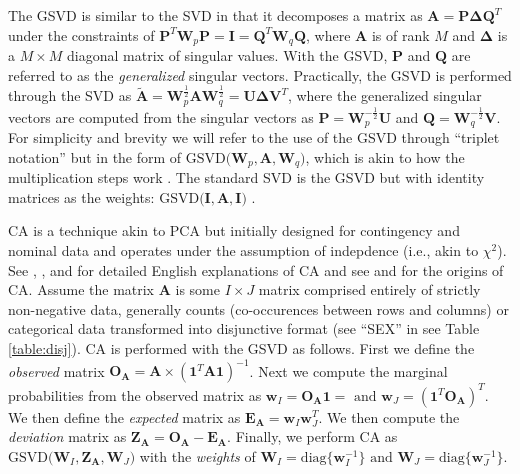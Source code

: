 \documentclass[12pt]{article}
\begin{document}
The GSVD is similar to the SVD in that it decomposes a matrix as
\({\mathbf A} = {\mathbf P} {\boldsymbol \Delta} {\mathbf Q}^{T}\) under
the constraints of
\({\mathbf P}^{T}{\mathbf W}_{p}{\mathbf P} = {\mathbf I} = {\mathbf Q}^{T}{\mathbf W}_{q}{\mathbf Q}\),
where \({\mathbf A}\) is of rank \(M\) and \({\boldsymbol \Delta}\) is a
\(M \times M\) diagonal matrix of singular values. With the GSVD,
\({\mathbf P}\) and \({\mathbf Q}\) are referred to as the
\emph{generalized} singular vectors. Practically, the GSVD is performed
through the SVD as
\(\widetilde{\mathbf A} = {\mathbf W}_{p}^{\frac{1}{2}}{\mathbf A}{\mathbf W}_{q}^{\frac{1}{2}} = {\mathbf U} {\boldsymbol \Delta} {\mathbf V}^{T}\),
where the generalized singular vectors are computed from the singular
vectors as \({\mathbf P} = {\mathbf W}_{p}^{-\frac{1}{2}}{\mathbf U}\)
and \({\mathbf Q} = {\mathbf W}_{q}^{-\frac{1}{2}}{\mathbf V}\). For
simplicity and brevity we will refer to the use of the GSVD through
``triplet notation'' \citep{holmes_multivariate_2008} but in the form of
\(\mathrm{GSVD(} {\mathbf W}_{p}, {\mathbf A}, {\mathbf W}_{q} \mathrm{)}\),
which is akin to how the multiplication steps work \citep[see
also][]{beaton2018generalization}. The standard SVD is the GSVD but with
identity matrices as the weights:
\(\mathrm{GSVD(} {\mathbf I}, {\mathbf A}, {\mathbf I} \mathrm{)}\)
\citep[see also][]{takane_relationships_2003}.

CA is a technique akin to PCA but initially designed for contingency and
nominal data and operates under the assumption of indepdence (i.e., akin
to \(\chi^2\)). See \citet{greenacre_theory_1984},
\citet{greenacre_correspondence_2010-1}, and
\citet{lebart_multivariate_1984} for detailed English explanations of CA
and see \citet{escofier-cordier_analyse_1965} and
\citet{benzecri_analyse_1973} for the origins of CA. Assume the matrix
\({\mathbf A}\) is some \(I \times J\) matrix comprised entirely of
strictly non-negative data, generally counts (co-occurences between rows
and columns) or categorical data transformed into disjunctive format
(see ``SEX'' in see Table \ref{table:disj}). CA is performed with the
GSVD as follows. First we define the \emph{observed} matrix
\({\mathbf O}_{\mathbf A} = {\mathbf A} \times ({\mathbf 1}^{T}{\mathbf A} {\mathbf 1})^{-1}\).
Next we compute the marginal probabilities from the observed matrix as
\({\mathbf w}_{I} = {\mathbf O}_{\mathbf A}{\mathbf 1} = \text{ and } {\mathbf w}_{J} = ({\mathbf 1}^{T}{\mathbf O}_{\mathbf A})^{T}\).
We then define the \emph{expected} matrix as
\({\mathbf E}_{\mathbf A} = {\mathbf w}_{I}{\mathbf w}_{J}^{T}\). We
then compute the \emph{deviation} matrix as
\({\mathbf Z}_{\mathbf A} = {\mathbf O}_{\mathbf A} - {\mathbf E}_{\mathbf A}\).
Finally, we perform CA as
\(\mathrm{GSVD(} {\mathbf W}_{I}, {\mathbf Z}_{\mathbf A}, {\mathbf W}_{J} \mathrm{)}\)
with the \emph{weights} of
\({\mathbf W}_{I} = \mathrm{diag\{} {\mathbf w}_{I}^{-1} \mathrm{\}} \text{ and } {\mathbf W}_{J} = \mathrm{diag\{} {\mathbf w}_{J}^{-1} \mathrm{\}}\).
\end{document}
